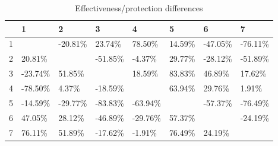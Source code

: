 \begin{table}[ht]
\centering
\begin{tabular}{rlllllll}
  \hline
 & 1 & 2 & 3 & 4 & 5 & 6 & 7 \\ 
  \hline
1 &  & -20.81\% & 23.74\% & 78.50\% & 14.59\% & -47.05\% & -76.11\% \\ 
  2 & 20.81\% &  & -51.85\% & -4.37\% & 29.77\% & -28.12\% & -51.89\% \\ 
  3 & -23.74\% & 51.85\% &  & 18.59\% & 83.83\% & 46.89\% & 17.62\% \\ 
  4 & -78.50\% & 4.37\% & -18.59\% &  & 63.94\% & 29.76\% & 1.91\% \\ 
  5 & -14.59\% & -29.77\% & -83.83\% & -63.94\% &  & -57.37\% & -76.49\% \\ 
  6 & 47.05\% & 28.12\% & -46.89\% & -29.76\% & 57.37\% &  & -24.19\% \\ 
  7 & 76.11\% & 51.89\% & -17.62\% & -1.91\% & 76.49\% & 24.19\% &  \\ 
   \hline
\end{tabular}
\caption{Effectiveness/protection differences} 
\end{table}
